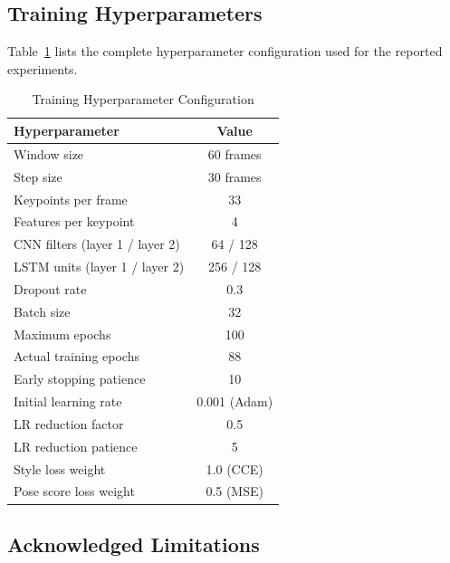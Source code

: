 \documentclass[journal]{IEEEtran}
\begin{document}
\subsection{Training Hyperparameters}

Table~\ref{tab:hyperparams} lists the complete hyperparameter
configuration used for the reported experiments.

\begin{table}[!t]
\caption{Training Hyperparameter Configuration}
\label{tab:hyperparams}
\centering
\begin{tabular}{lc}
\toprule
\textbf{Hyperparameter} & \textbf{Value} \\
\midrule
Window size & 60 frames \\
Step size & 30 frames \\
Keypoints per frame & 33 \\
Features per keypoint & 4 \\
CNN filters (layer 1 / layer 2) & 64 / 128 \\
LSTM units (layer 1 / layer 2) & 256 / 128 \\
Dropout rate & 0.3 \\
Batch size & 32 \\
Maximum epochs & 100 \\
Actual training epochs & 88 \\
Early stopping patience & 10 \\
Initial learning rate & 0.001 (Adam) \\
LR reduction factor & 0.5 \\
LR reduction patience & 5 \\
Style loss weight & 1.0 (CCE) \\
Pose score loss weight & 0.5 (MSE) \\
\bottomrule
\end{tabular}
\end{table}

\subsection{Acknowledged Limitations}
\label{subsec:limitations}
\end{document}

